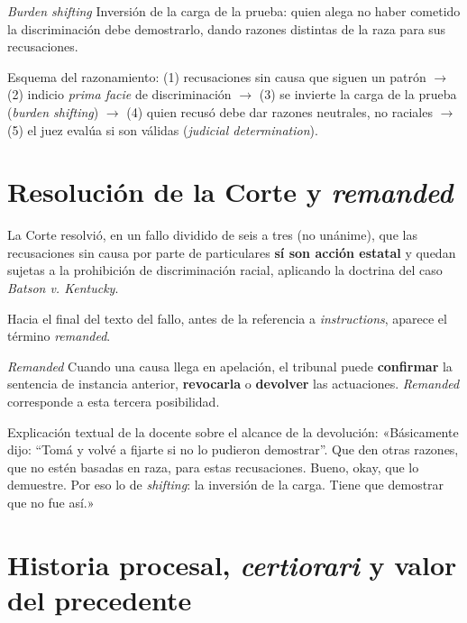 \documentclass[12pt,oneside]{book}
\begin{document}
\begin{definition}{\textit{Burden shifting}}
Inversión de la carga de la prueba: quien alega no haber cometido la discriminación debe demostrarlo, dando razones distintas de la raza para sus recusaciones.
\end{definition}

\begin{important}
Esquema del razonamiento: (1) recusaciones sin causa que siguen un patrón $\rightarrow$ (2) indicio \textit{prima facie} de discriminación $\rightarrow$ (3) se invierte la carga de la prueba (\textit{burden shifting}) $\rightarrow$ (4) quien recusó debe dar razones neutrales, no raciales $\rightarrow$ (5) el juez evalúa si son válidas (\textit{judicial determination}).
\end{important}

\section{Resolución de la Corte y \textit{remanded}}

La Corte resolvió, en un fallo dividido de seis a tres (no unánime), que las recusaciones sin causa por parte de particulares \textbf{sí son acción estatal} y quedan sujetas a la prohibición de discriminación racial, aplicando la doctrina del caso \textit{Batson v. Kentucky}.

Hacia el final del texto del fallo, antes de la referencia a \textit{instructions}, aparece el término \textit{remanded}.


\begin{definition}{\textit{Remanded}}
Cuando una causa llega en apelación, el tribunal puede \textbf{confirmar} la sentencia de instancia anterior, \textbf{revocarla} o \textbf{devolver} las actuaciones. \textit{Remanded} corresponde a esta tercera posibilidad.
\end{definition}

Explicación textual de la docente sobre el alcance de la devolución: «Básicamente dijo: ``Tomá y volvé a fijarte si no lo pudieron demostrar''. Que den otras razones, que no estén basadas en raza, para estas recusaciones. Bueno, okay, que lo demuestre. Por eso lo de \textit{shifting}: la inversión de la carga. Tiene que demostrar que no fue así.»

\section{Historia procesal, \textit{certiorari} y valor del precedente}
\end{document}

